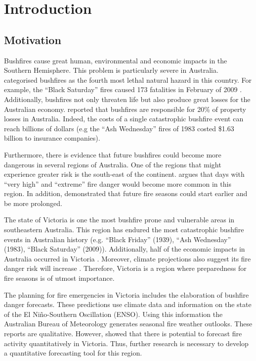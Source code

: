 
\chapter{Introduction}
\newpage{}

\section{Motivation}

Bushfires cause great human, environmental and economic impacts in
the Southern Hemisphere. This problem is particularly severe in Australia.
\citet{Haynes2010} categorised bushfires as the fourth most lethal
natural hazard in this country. For example, the \textquotedblleft Black
Saturday\textquotedblright{} fires caused 173 fatalities in February
of 2009 \citep{Teague2010}. Additionally, bushfires not only threaten
life but also produce great losses for the Australian economy. \citet{McAneney2009}
reported that bushfires are responsible for 20\% of property losses
in Australia. Indeed, the costs of a single catastrophic bushfire
event can reach billions of dollars (e.g the ``Ash Wednesday'' fires
of 1983 costed \$1.63 billion to insurance companies).

Furthermore, there is evidence that future bushfires could become
more dangerous in several regions of Australia. One of the regions
that might experience greater risk is the south-east of the continent.
\citet{Lucas2007} argues that days with \textquotedblleft very high\textquotedblright{}
and \textquotedblleft extreme\textquotedblright{} fire danger would
become more common in this region. In addition, \citet{Clarke2011}
demonstrated that future fire seasons could start earlier and be more
prolonged. 

The state of Victoria is one the most bushfire prone and vulnerable
areas in southeastern Australia. This region has endured the most catastrophic
bushfire events in Australian history (e.g. ``Black Friday'' (1939),
``Ash Wednesday'' (1983), ``Black Saturday'' (2009)). Additionally,
half of the economic impacts in Australia occurred in Victoria \citep{Luke1978}.
Moreover, climate projections also suggest its fire danger risk will
increase \citep{Clarke2011}. Therefore, Victoria is a region where
preparedness for fire seasons is of utmost importance.

The planning for fire emergencies in Victoria includes the elaboration
of bushfire danger forecasts. These predictions use climate data and
information on the state of the El Ni\~no-Southern Oscillation (ENSO).
Using this information the Australian Bureau of Meteorology generates
seasonal fire weather outlooks. These reports are qualitative. However,
\citet{Harris2013} showed that there is potential to forecast fire
activity quantitatively in Victoria. Thus, further research is necessary
to develop a quantitative forecasting tool for this region. 

